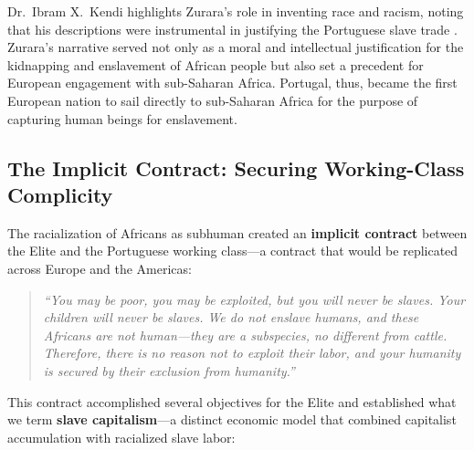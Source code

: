 \documentclass[12pt]{article}
\begin{document}
Dr.\ Ibram X.\ Kendi highlights Zurara's role in inventing race and racism, noting that his descriptions were instrumental in justifying the Portuguese slave trade \cite{kendi}. Zurara's narrative served not only as a moral and intellectual justification for the kidnapping and enslavement of African people but also set a precedent for European engagement with sub-Saharan Africa. Portugal, thus, became the first European nation to sail directly to sub-Saharan Africa for the purpose of capturing human beings for enslavement.

\subsection{The Implicit Contract: Securing Working-Class Complicity}

The racialization of Africans as subhuman created an \textbf{implicit contract} between the Elite and the Portuguese working class---a contract that would be replicated across Europe and the Americas:

\begin{quote}
\textit{``You may be poor, you may be exploited, but you will never be slaves. Your children will never be slaves. We do not enslave humans, and these Africans are not human---they are a subspecies, no different from cattle. Therefore, there is no reason not to exploit their labor, and your humanity is secured by their exclusion from humanity.''}
\end{quote}

This contract accomplished several objectives for the Elite and established what we term \textbf{slave capitalism}---a distinct economic model that combined capitalist accumulation with racialized slave labor:
\end{document}
